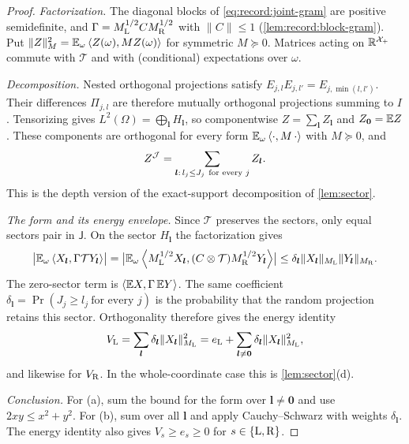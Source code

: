 \begin{proof}
\emph{Factorization.} The diagonal blocks of \eqref{eq:record:joint-gram}
are positive semidefinite, and $\Gamma=M_{\rm L}^{1/2}CM_{\rm R}^{1/2}$ with
$\|C\|\le1$ (\cref{lem:record:block-gram}). Put
$\|Z\|_M^2=\mathbb E_\omega\left\langle Z(\omega),MZ(\omega)\right\rangle$ for symmetric $M\succeq0$.
Matrices acting on $\mathbb R^{\mathcal X_+}$ commute with $\mathcal T$ and with
(conditional) expectations over $\omega$.

\emph{Decomposition.} Nested orthogonal projections satisfy
$E_{j,l}E_{j,l'}=E_{j,\min(l,l')}$. Their differences $\Pi_{j,l}$ are
therefore mutually orthogonal projections summing to $I$. Tensorizing gives
$L^2(\Omega)=\bigoplus_{\boldsymbol l}H_{\boldsymbol l}$, so componentwise
$Z=\sum_{\boldsymbol l}Z_{\boldsymbol l}$ and
$Z_{\boldsymbol0}=\mathbb E Z$. These components are orthogonal for every form
$\mathbb E_\omega\left\langle \cdot,M\,\cdot\right\rangle$ with $M\succeq0$, and
\[
 Z^\Jc=\sum_{\boldsymbol l:\,l_j\le J_j\ \text{for every }j}Z_{\boldsymbol l}.
\]
This is the depth version of the exact-support decomposition of
\cref{lem:sector}.

\emph{The form and its energy envelope.} Since $\mathcal T$ preserves the
sectors, only equal sectors pair in $\mathsf J$. On the sector
$H_{\boldsymbol l}$ the factorization gives
\[
 \bigl|\mathbb E_\omega\left\langle X_{\boldsymbol l},\Gamma\mathcal TY_{\boldsymbol l}\right\rangle\bigr|
 =\bigl|\mathbb E_\omega\left\langle M_{\rm L}^{1/2}X_{\boldsymbol l},(C\otimes\mathcal T)M_{\rm R}^{1/2}Y_{\boldsymbol l}\right\rangle\bigr|
 \le\delta_{\boldsymbol l}\|X_{\boldsymbol l}\|_{M_{\rm L}}
 \|Y_{\boldsymbol l}\|_{M_{\rm R}}.
\]
The zero-sector term is $\left\langle \mathbb E X,\Gamma\,\mathbb E Y\right\rangle$. The same coefficient
$\delta_{\boldsymbol l}=\Pr(J_j\ge l_j\ \text{for every }j)$ is the
probability that the random projection retains this sector. Orthogonality
therefore gives the energy identity
\[
 V_{\rm L}=\sum_{\boldsymbol l}\delta_{\boldsymbol l}
 \|X_{\boldsymbol l}\|^2_{M_{\rm L}}
 =e_{\rm L}+\sum_{\boldsymbol l\ne\boldsymbol0}\delta_{\boldsymbol l}
 \|X_{\boldsymbol l}\|^2_{M_{\rm L}},
\]
and likewise for $V_{\rm R}$. In the whole-coordinate case this is
\cref{lem:sector}(d).

\emph{Conclusion.} For (a), sum the bound for the form over
$\boldsymbol l\ne\boldsymbol0$ and use $2xy\le x^2+y^2$. For (b), sum over all
$\boldsymbol l$ and apply Cauchy--Schwarz with weights
$\delta_{\boldsymbol l}$. The energy identity also gives
$V_s\ge e_s\ge0$ for $s\in\{{\rm L},{\rm R}\}$.
\end{proof}

